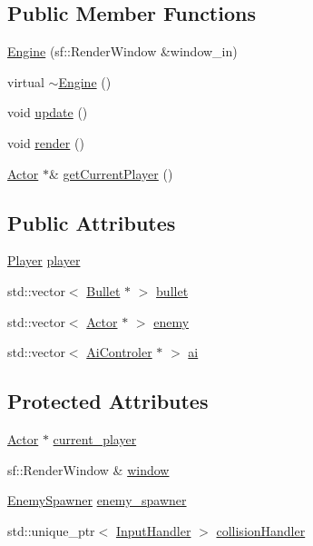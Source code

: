 \subsection*{Public Member Functions}
\begin{DoxyCompactItemize}
\item 
\hyperlink{class_engine_a74e8b812fd1bac60a35aaead9c3e81f8}{Engine} (sf\+::\+Render\+Window \&window\+\_\+in)
\item 
virtual \hyperlink{class_engine_a8ef7030a089ecb30bbfcb9e43094717a}{$\sim$\+Engine} ()
\item 
void \hyperlink{class_engine_ad2ff110d5a86c1cd60b541d65915ac48}{update} ()
\item 
void \hyperlink{class_engine_a7960743aefd62e846e7f3cd92c18bc73}{render} ()
\item 
\hyperlink{class_actor}{Actor} $\ast$\& \hyperlink{class_engine_a18a33a26bb217ac04e3a540a343a6d99}{get\+Current\+Player} ()
\end{DoxyCompactItemize}
\subsection*{Public Attributes}
\begin{DoxyCompactItemize}
\item 
\hyperlink{class_player}{Player} \hyperlink{class_engine_abd0ff72a70b7643680cff6cd0513620f}{player}
\item 
std\+::vector$<$ \hyperlink{class_bullet}{Bullet} $\ast$ $>$ \hyperlink{class_engine_a267b13093cb4ea1de9c297a96b0314ea}{bullet}
\item 
std\+::vector$<$ \hyperlink{class_actor}{Actor} $\ast$ $>$ \hyperlink{class_engine_af5735da922e4f9fd64db49993dc8efe3}{enemy}
\item 
std\+::vector$<$ \hyperlink{class_ai_controler}{Ai\+Controler} $\ast$ $>$ \hyperlink{class_engine_a82c1ca4ee6f6dd4e9b79918aa12c156f}{ai}
\end{DoxyCompactItemize}
\subsection*{Protected Attributes}
\begin{DoxyCompactItemize}
\item 
\hyperlink{class_actor}{Actor} $\ast$ \hyperlink{class_engine_ab488c2946ac31376f272acc1eaf815b7}{current\+\_\+player}
\item 
sf\+::\+Render\+Window \& \hyperlink{class_engine_ae5fb055a0acce41034a9bff218dd87b1}{window}
\item 
\hyperlink{class_enemy_spawner}{Enemy\+Spawner} \hyperlink{class_engine_ac38501b7527b3c8ce22f8b31a13821ea}{enemy\+\_\+spawner}
\item 
std\+::unique\+\_\+ptr$<$ \hyperlink{class_input_handler}{Input\+Handler} $>$ \hyperlink{class_engine_a20fca6041ee94486e4ed1ec48d63dfef}{collision\+Handler}
\end{DoxyCompactItemize}


